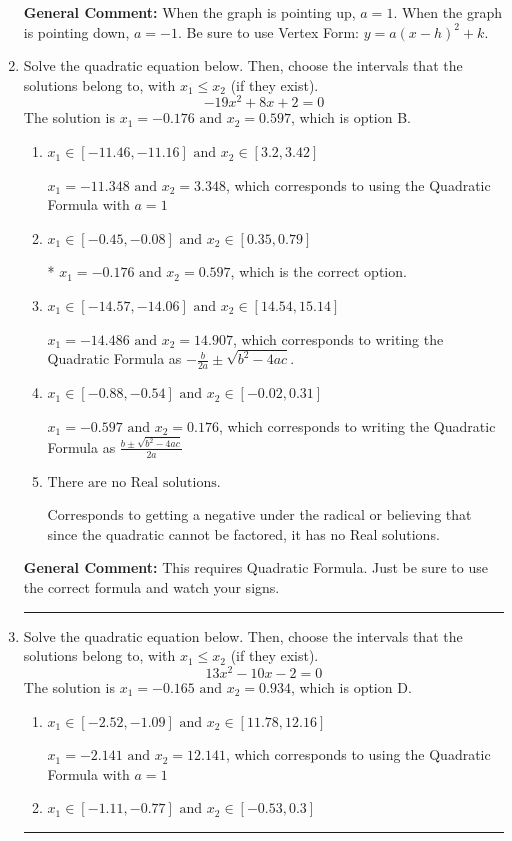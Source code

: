 \documentclass{extbook}[14pt]
\newcommand{\litem}[1]{\item #1

\rule{\textwidth}{0.4pt}}
\begin{document}
\begin{enumerate}
{\textbf{General Comment:} When the graph is pointing up, $a=1$. When the graph is pointing down, $a=-1$. Be sure to use Vertex Form: $y = a(x-h)^2+k$.
}
\litem{
Solve the quadratic equation below. Then, choose the intervals that the solutions belong to, with $x_1 \leq x_2$ (if they exist).
\[ -19x^{2} +8 x + 2 = 0 \]The solution is \( x_1 = -0.176 \text{ and } x_2 = 0.597 \), which is option B.\begin{enumerate}[label=\Alph*.]
\item \( x_1 \in [-11.46, -11.16] \text{ and } x_2 \in [3.2, 3.42] \)

 $x_1 = -11.348 \text{ and } x_2 = 3.348$, which corresponds to using the Quadratic Formula with $a=1$
\item \( x_1 \in [-0.45, -0.08] \text{ and } x_2 \in [0.35, 0.79] \)

* $x_1 = -0.176 \text{ and } x_2 = 0.597$, which is the correct option.
\item \( x_1 \in [-14.57, -14.06] \text{ and } x_2 \in [14.54, 15.14] \)

 $x_1 = -14.486 \text{ and } x_2 = 14.907$, which corresponds to writing the Quadratic Formula as $-\frac{b}{2a} \pm \sqrt{b^2 - 4ac}$.
\item \( x_1 \in [-0.88, -0.54] \text{ and } x_2 \in [-0.02, 0.31] \)

 $x_1 = -0.597 \text{ and } x_2 = 0.176$, which corresponds to writing the Quadratic Formula as $\frac{b \pm \sqrt{b^2 - 4ac}}{2a}$
\item \( \text{There are no Real solutions.} \)

Corresponds to getting a negative under the radical or believing that since the quadratic cannot be factored, it has no Real solutions.
\end{enumerate}

\textbf{General Comment:} This requires Quadratic Formula. Just be sure to use the correct formula and watch your signs.
}
\litem{
Solve the quadratic equation below. Then, choose the intervals that the solutions belong to, with $x_1 \leq x_2$ (if they exist).
\[ 13x^{2} -10 x -2 = 0 \]The solution is \( x_1 = -0.165 \text{ and } x_2 = 0.934 \), which is option D.\begin{enumerate}[label=\Alph*.]
\item \( x_1 \in [-2.52, -1.09] \text{ and } x_2 \in [11.78, 12.16] \)

 $x_1 = -2.141 \text{ and } x_2 = 12.141$, which corresponds to using the Quadratic Formula with $a=1$
\item \( x_1 \in [-1.11, -0.77] \text{ and } x_2 \in [-0.53, 0.3] \)


\end{enumerate}}
\end{enumerate}
\end{document}
